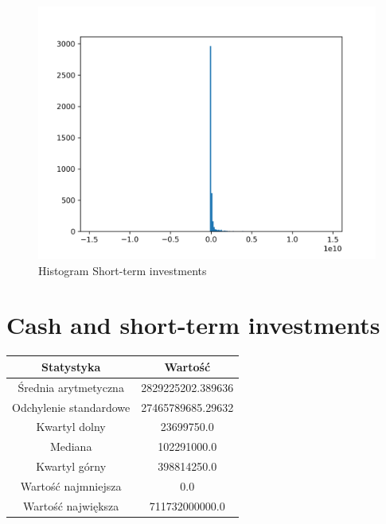 \documentclass{article}
\begin{document}
\begin{figure}[h!]
    \includegraphics[width=\linewidth]{variables/Short-term investments.png}
    \caption{Histogram Short-term investments }
\end{figure}\section{ Cash and short-term investments }

\begin{center}
    \begin{tabular}{|c | c|} 
    \hline
    Statystyka & Wartość \\
    \hline\hline
    Średnia arytmetyczna & 2829225202.389636 \\ 
    \hline
    Odchylenie standardowe & 27465789685.29632 \\
    \hline
    Kwartyl dolny & 23699750.0 \\
    \hline
    Mediana & 102291000.0 \\
    \hline
    Kwartyl górny & 398814250.0 \\
    \hline
    Wartość najmniejsza & 0.0 \\
    \hline
    Wartość największa & 711732000000.0 \\
    \hline
   \end{tabular}
\end{center}
\end{document}
